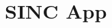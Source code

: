 \documentclass[../../main]{subfiles}
\begin{document}
\section{SINC App} \label{sec:}
\end{document}
